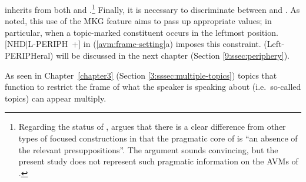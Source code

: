 


 inherits from both  and
.\footnote{Regarding the status of ,
  \citet[232]{lambrecht:96} argues that there is a clear
  difference from other types of focused constructions in that the
  pragmatic core of  is ``an absence of the relevant
  presuppositions''.  The argument sounds convincing, but the present
  study does not represent such pragmatic information on the AVMs of
  .} Finally, it is
necessary to discriminate between  and
. As noted, this use of the MKG feature aims to
pass up appropriate values; in particular, when a topic-marked
constituent occurs in the leftmost
position. \mbox{[NHD{$\mid$}L-PERIPH +]} in (\ref{avm:frame-setting}a)
imposes this constraint.
 (Left-PERIPHeral) will be discussed in the next chapter
(Section \ref{9:ssec:periphery}).





\noindent As seen in Chapter~\ref{chapter3}
(Section \ref{3:sssec:multiple-topics}) topics that function to restrict the
frame of what the speaker is speaking about (i.e.\ so-called
 topics) can appear multiply.


